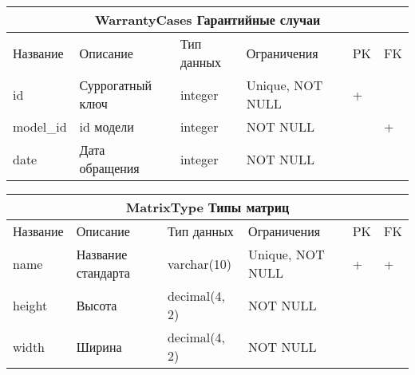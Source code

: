\documentclass{article}
\begin{document}
\begin{tabular}{ |p{4.5cm}|p{4cm}|p{3cm}|p{3cm}|p{2cm}|p{1cm}| }
\hline
\multicolumn{6}{|c|}{WarrantyCases Гарантийные случаи} \\
\hline
Название & Описание & Тип данных & Ограничения & PK & FK\\
\hline
id                                  &   %
Суррогатный ключ                    &   %
integer                             &   %
Unique, NOT NULL                    &   %
 +                                  &   %
                                    \\  %
\hline
model\_id                           &   %
id модели                           &   %
integer                             &   %
NOT NULL                            &   %
                                    &   %
 +                                  \\  %
\hline
date                                &   %
Дата обращения                      &   %
integer                             &   %
NOT NULL                            &   %
                                    &   %
                                    \\  %
\hline
\end{tabular}

\begin{tabular}{ |p{4.5cm}|p{4cm}|p{3cm}|p{3cm}|p{2cm}|p{1cm}| }
\hline
\multicolumn{6}{|c|}{MatrixType Типы матриц} \\
\hline
Название & Описание & Тип данных & Ограничения & PK & FK\\
\hline
name                                &   %
Название стандарта                  &   %
varchar(10)                         &   %
Unique, NOT NULL                    &   %
 +                                  &   %
 +                                  \\  %
\hline
height                              &   %
Высота                              &   %
decimal(4, 2)                       &   %
NOT NULL                            &   %
                                    &   %
                                    \\  %
\hline
width                               &   %
Ширина                              &   %
decimal(4, 2)                       &   %
NOT NULL                            &   %
                                    &   %
                                    \\  %
\hline
\end{tabular}
\end{document}
